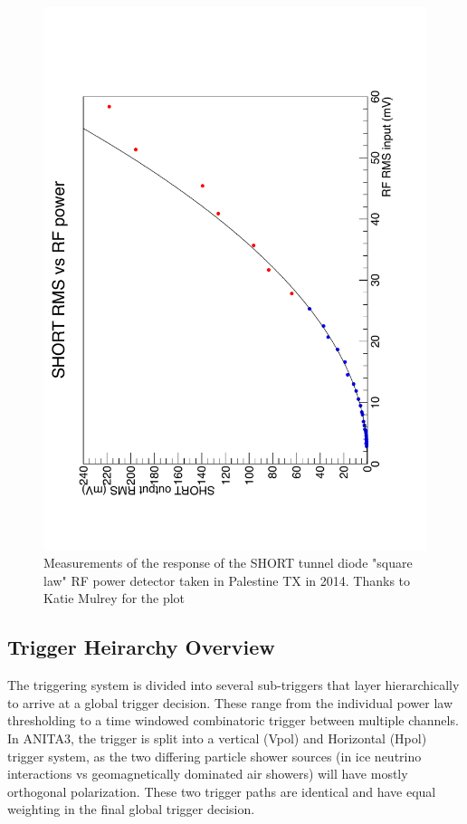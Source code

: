 \begin{figure}
	\centering
	\includegraphics[height=0.8\textheight,angle=-90]{figures/RMS_in_out}
	\caption{Measurements of the response of the SHORT tunnel diode "square law" RF power detector taken in Palestine TX in 2014.  Thanks to Katie Mulrey for the plot}
	\label{fig:SHORT_square}
\end{figure}
		
	
	\subsection{Trigger Heirarchy Overview}
		The triggering system is divided into several sub-triggers that layer hierarchically to arrive at a global trigger decision.   These range from the individual power law thresholding to a time windowed combinatoric trigger between multiple channels.  In ANITA3, the trigger is split into a vertical (Vpol) and Horizontal (Hpol) trigger system, as the two differing particle shower sources (in ice neutrino interactions vs geomagnetically dominated air showers) will have mostly orthogonal polarization.  These two trigger paths are identical and have equal weighting in the final global trigger decision.  
		
